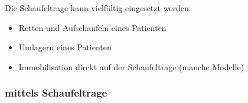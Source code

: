 Die Schaufeltrage kann vielfältig eingesetzt werden:

\begin{itemize}
  \item Retten und Aufschaufeln eines Patienten \dotfill
  \item Umlagern eines Patienten \dotfill {}
  \item Immobilisation direkt auf der Schaufeltrage (manche
  Modelle) \dotfill {}
\end{itemize}

\clearpage
\subsubsection{ mittels Schaufeltrage}
\label{topic:schaufeltrage-aufschaufeln}

